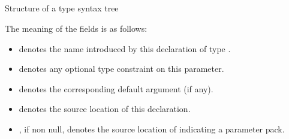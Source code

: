 \subsection{}
\label{sec:ifc:SyntaxSort:RequirementBody}

\begin{Structure}
	\label{fig:ifc:SyntaxSort:RequirementBody}
\end{Structure}



\subsection{}
\label{sec:ifc:SyntaxSort:TypeTemplateParameter}

\begin{Structure}
	\caption{Structure of a type  syntax tree}
	\label{fig:ifc:SyntaxSort:TypeTemplateParameter}
\end{Structure}
%
The meaning of the fields is as follows:
\begin{itemize}
	\item {} denotes the name introduced by this declaration of type .
	\item {} denotes any optional type constraint on this parameter.
	\item {} denotes the corresponding default argument (if any).
	\item {} denotes the source location of this declaration.
	\item {}, if non null, denotes the source location of  indicating a parameter pack.
\end{itemize}

